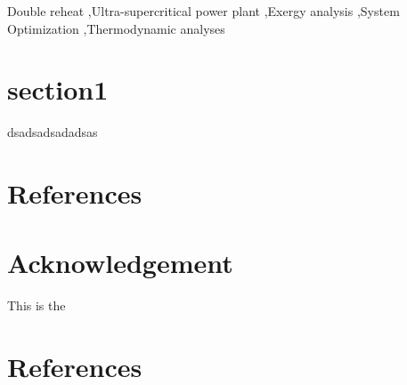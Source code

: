 \documentclass[preprint,12pt]{elsarticle}
\begin{document}
\begin{frontmatter}
\begin{keyword}


Double reheat \sep Ultra-supercritical power plant \sep Exergy analysis \sep System Optimization \sep Thermodynamic analyses
\end{keyword}

\end{frontmatter}


\section{section1}
dsadsadsadadsas\cite{Brooks1983CHARMM}
\label{}







%
\section{References}
\section*{Acknowledgement}
This is the 
\clearpage
\section*{References}


\end{document}
